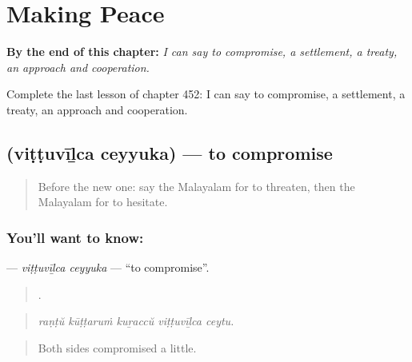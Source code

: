 
\chapter{Making Peace}
\label{ch:ml-making-peace}

\begin{chapteropening}
\textbf{By the end of this chapter:} \emph{I can say to compromise, a settlement, a treaty, an approach and cooperation.}

Complete the last lesson of chapter 452: I can say to compromise, a settlement, a treaty, an approach and cooperation.
\end{chapteropening}

\section[\texorpdfstring{\ml{വിട്ടുവീഴ്ച} \ml{ചെയ്യുക} (viṭṭuvīḻca ceyyuka)}{വിട്ടുവീഴ്ച ചെയ്യുക (viṭṭuvīḻca ceyyuka)}]{  (viṭṭuvīḻca ceyyuka) — to compromise}

\label{lesson:ML-C452-vittuvilca-ceyyuka}



\begin{quote}
Before the new one: say the Malayalam for to threaten, then the Malayalam for to hesitate.
\end{quote}

\subsection*{You'll want to know:  }
\textbf{ } — \emph{viṭṭuvīḻca ceyyuka} — \textquotedblleft{}to compromise\textquotedblright{}.

\begin{quote}
    .
\end{quote}

\begin{quote}
\emph{raṇṭŭ kūṭṭaruṁ kuṟaccŭ viṭṭuvīḻca ceytu.}
\end{quote}

\begin{quote}
Both sides compromised a little.
\end{quote}

